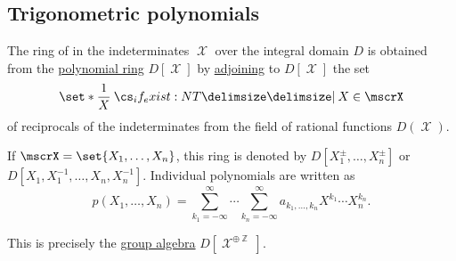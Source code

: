 \subsection{Trigonometric polynomials}\label{subsec:trigonometric_polynomials}

\begin{definition}\label{def:ring_of_laurent_polynomials}
  The ring of  in the indeterminates \( \mscrX \) over the integral domain \( D \) is obtained from the \hyperref[def:polynomial_algebra]{polynomial ring} \( D[\mscrX] \) by \hyperref[def:field_adjunction]{adjoining} to \( D[\mscrX] \) the set
  \begin{equation*}
    \set*{ \frac 1 X \given* X \in \mscrX }
  \end{equation*}
  of reciprocals of the indeterminates from the field of rational functions \( D(\mscrX) \).

  If \( \mscrX = \set{ X_1, \ldots, X_n } \), this ring is denoted by \( D[X_1^\pm, \ldots, X_n^\pm] \) or \( D[X_1, X_1^{-1}, \ldots, X_n, X_n^{-1}] \). Individual polynomials are written as
  \begin{equation*}
    p(X_1, \ldots, X_n) = \sum_{k_1=-\infty}^\infty \cdots \sum_{k_n=-\infty}^\infty a_{k_1, \ldots, k_n} X^{k_1} \cdots X_n^{k_n}.
  \end{equation*}
\end{definition}
\begin{comments}
  \item This is precisely the \hyperref[def:semigroup_algebra]{group algebra} \( D[\mscrX^{\oplus \BbbZ}] \).
\end{comments}

